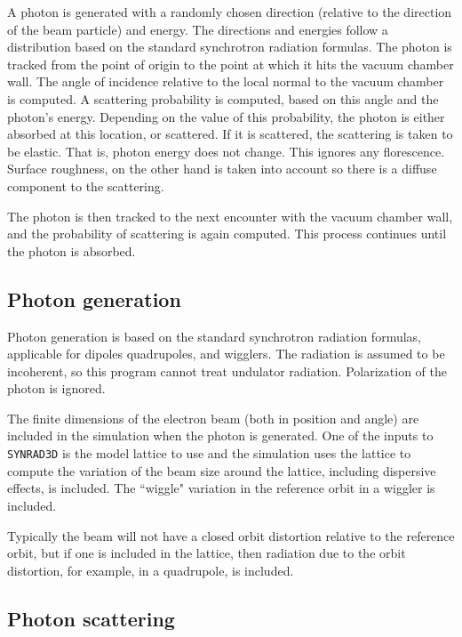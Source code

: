 \documentclass[11pt]{article}
\newcommand{\srthree}{\texttt{SYNRAD3D}\xspace}
\begin{document}
A photon is generated with a randomly chosen direction (relative to
the direction of the beam particle) and energy. The directions and
energies follow a distribution based on the standard synchrotron
radiation formulas. The photon is tracked from the point of origin to
the point at which it hits the vacuum chamber wall. The angle of
incidence relative to the local normal to the vacuum chamber is
computed. A scattering probability is computed, based on this angle
and the photon's energy. Depending on the value of this probability,
the photon is either absorbed at this location, or scattered. If it is
scattered, the scattering is taken to be elastic. That is, photon
energy does not change. This ignores any florescence. Surface
roughness, on the other hand is taken into account so there is a
diffuse component to the scattering.

The photon is then tracked to the next encounter with the vacuum
chamber wall, and the probability of scattering is again
computed. This process continues until the photon is absorbed.

\subsection{Photon generation}

Photon generation is based on the standard synchrotron radiation
formulas, applicable for dipoles quadrupoles, and wigglers. The
radiation is assumed to be incoherent, so this program cannot treat
undulator radiation. Polarization of the photon is ignored.

The finite dimensions of the electron beam (both in position and
angle) are included in the simulation when the photon is
generated. One of the inputs to \srthree is the model lattice
to use and the simulation uses the lattice to compute the
variation of the beam size around the lattice, including dispersive
effects, is included. The ``wiggle" variation in the reference orbit
in a wiggler is included.

Typically the beam will not have a closed orbit distortion relative to
the reference orbit, but if one is included in the lattice, then
radiation due to the orbit distortion, for example, in a quadrupole,
is included.  

\subsection{Photon scattering} 
\end{document}
